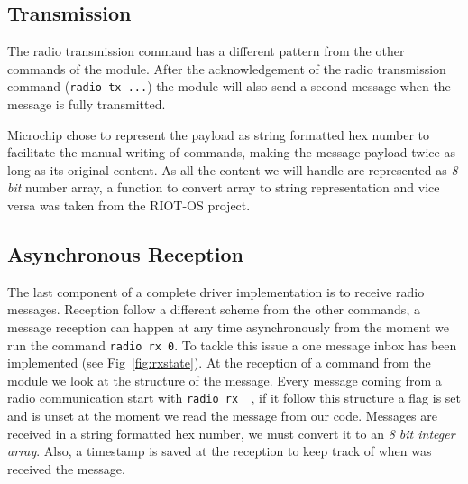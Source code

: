 

\subsection{Transmission}

The radio transmission command has a different pattern from the other commands 
of the module. After the acknowledgement of the radio transmission 
command (\lstinline{radio tx ...}) the module will also send a second message
when the message is fully transmitted.



Microchip chose to represent the payload as string formatted hex number to
facilitate the manual writing of commands, making the message payload twice as
long as its original content. As all the content we will handle 
are represented as \emph{8 bit} number array, a function to convert array to
string representation and vice versa was taken from the RIOT-OS project.

\subsection{Asynchronous Reception}

The last component of a complete driver implementation is to receive radio
messages.
Reception follow a different scheme from the other commands, a message
reception can happen at any time asynchronously from the moment we run the
command \lstinline{radio rx 0}.
To tackle this issue a one message inbox has been implemented (see
Fig~\ref{fig:rxstate}).
At the reception of a command from the module we look at the structure of
the message.
Every message coming from a radio communication start with \lstinline{radio rx  }, 
if it follow this structure a flag is set and is unset at the moment we read the
message from our code.
Messages are received in a string formatted hex number, we must convert it to an
\emph{8 bit integer array}. 
Also, a timestamp is saved at the reception to keep track of when was received the
message.



